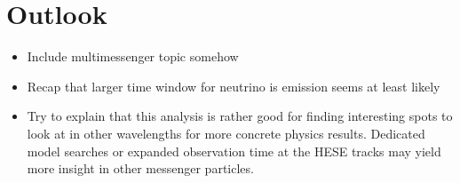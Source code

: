 \chapter{Outlook}

\begin{itemize}
  \item Include multimessenger topic somehow
  \item Recap that larger time window for neutrino is emission seems at least likely
  \item Try to explain that this analysis is rather good for finding interesting spots to look at in other wavelengths for more concrete physics results.
  Dedicated model searches or expanded observation time at the HESE tracks may yield more insight in other messenger particles.
\end{itemize}
